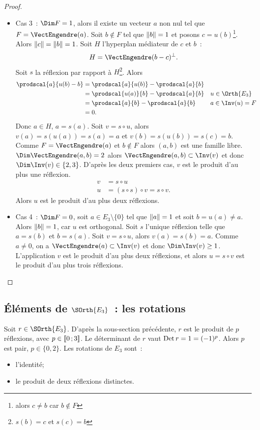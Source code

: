 \begin{proof}
\begin{itemize}
  \item Cas 3~: $\Dim F=1$, alors il existe un vecteur $a$ non nul tel que $F=\VectEngendre(a)$. Soit $b \notin F$ tel que $\left\lVert b\right\rVert=1$ et posons $c=u(b)$\footnote{alors $c\neq b$ car $b \notin F$}. Alors $\left\lVert c\right\rVert=\left\lVert b\right\rVert=1$. Soit $H$ l'hyperplan médiateur de $c$ et $b$~:
    \begin{equation}
      H = \VectEngendre(b-c)^\perp.
    \end{equation}
    Soit $s$ la réflexion par rapport à $H$\footnote{$s(b)=c$ et $s(c)=b$}. Alors
    \begin{align}
      \prodscal{a}{u(b)-b} &=\prodscal{a}{u(b)} - \prodscal{a}{b} \\
      &=\prodscal{u(a)}{b} - \prodscal{a}{b} && u \in \Orth{E_3}\\
      &=\prodscal{a}{b} - \prodscal{a}{b} && a \in \Inv(u)=F \\
      &=0.
    \end{align}
    Donc $a \in H$, $a=s(a)$. Soit $v=s \circ u$, alors $v(a)=s(u(a))=s(a)=a$ et $v(b)=s(u(b))=s(c)=b$. Comme $F=\VectEngendre(a)$ et $b \notin F$ alors $(a,b)$ est une famille libre. $\Dim \VectEngendre(a,b)=2$ alors $\VectEngendre(a,b) \subset \Inv(v)$ et donc $\Dim\Inv(v) \in \{2,3\}$. D'après les deux premiers cas, $v$ est le produit d'au plus une réflexion.
    \begin{align}
      v &=s \circ u \\
      u &=(s \circ s) \circ v = s \circ v.
    \end{align}
    Alors $u$ est le produit d'au plus deux réflexions.
  \item Cas 4~: $\Dim F=0$, soit $a \in E_3 \setminus \{0\}$ tel que $\left\lVert a\right\rVert=1$ et soit $b=u(a)\neq a$. Alors $\left\lVert b\right\rVert=1$, car $u$ est orthogonal. Soit $s$ l'unique réflexion telle que $a=s(b)$ et $b=s(a)$. Soit $v=s \circ u$, alors $v(a)=s(b)=a$. Comme $a \neq 0$, on a $\VectEngendre(a) \subset \Inv(v)$ et donc $\Dim \Inv(v) \geq 1$. L'application $v$ est le produit d'au plus deux réflexions, et alors $u=s \circ v$ est le produit d'au plus trois réflexions.
  \end{itemize}
\end{proof}

\subsection{Éléments de $\SOrth{E_3}$~: les rotations}

Soit $r \in \SOrth{E_3}$. D'après la sous-section précédente, $r$ est le produit de $p$ réflexions, avec $p \in \mathopen{\llbracket}0\mathclose{}\mathpunct{};3\mathclose{\rrbracket}$. Le déterminant de $r$ vaut $\operatorname{Det} r =1=(-1)^p$. Alors $p$ est pair, $p \in \{0,2\}$. Les rotations de $E_3$ sont~:
\begin{itemize}
\item l'identité;
\item le produit de deux réflexions distinctes.
\end{itemize}

